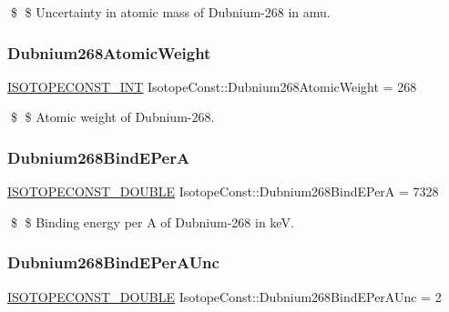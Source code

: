 \$ \$ Uncertainty in atomic mass of Dubnium-\/268 in amu. \mbox{\label{group___isotope_const-_dubnium-_db268_gafb335725386c32f16ef73ac45dcbe993}} 
\subsubsection{\texorpdfstring{Dubnium268\+Atomic\+Weight}{Dubnium268AtomicWeight}}
{\footnotesize\ttfamily \mbox{\hyperlink{group___isotope_const-_macros_ga5f18360b3e99483a35c32d789e62621c}{I\+S\+O\+T\+O\+P\+E\+C\+O\+N\+S\+T\+\_\+\+I\+NT}} Isotope\+Const\+::\+Dubnium268\+Atomic\+Weight = 268}

\$ \$ Atomic weight of Dubnium-\/268. \mbox{\label{group___isotope_const-_dubnium-_db268_ga63b35d7222b7cddd7972aee32853a763}} 
\subsubsection{\texorpdfstring{Dubnium268\+Bind\+E\+PerA}{Dubnium268BindEPerA}}
{\footnotesize\ttfamily \mbox{\hyperlink{group___isotope_const-_macros_ga8f45a7272ce02c0b4c65c44636ed719a}{I\+S\+O\+T\+O\+P\+E\+C\+O\+N\+S\+T\+\_\+\+D\+O\+U\+B\+LE}} Isotope\+Const\+::\+Dubnium268\+Bind\+E\+PerA = 7328}

\$ \$ Binding energy per A of Dubnium-\/268 in keV. \mbox{\label{group___isotope_const-_dubnium-_db268_ga9fb5d7bbaedab67f4bcdb920491d17ee}} 
\subsubsection{\texorpdfstring{Dubnium268\+Bind\+E\+Per\+A\+Unc}{Dubnium268BindEPerAUnc}}
{\footnotesize\ttfamily \mbox{\hyperlink{group___isotope_const-_macros_ga8f45a7272ce02c0b4c65c44636ed719a}{I\+S\+O\+T\+O\+P\+E\+C\+O\+N\+S\+T\+\_\+\+D\+O\+U\+B\+LE}} Isotope\+Const\+::\+Dubnium268\+Bind\+E\+Per\+A\+Unc = 2}

